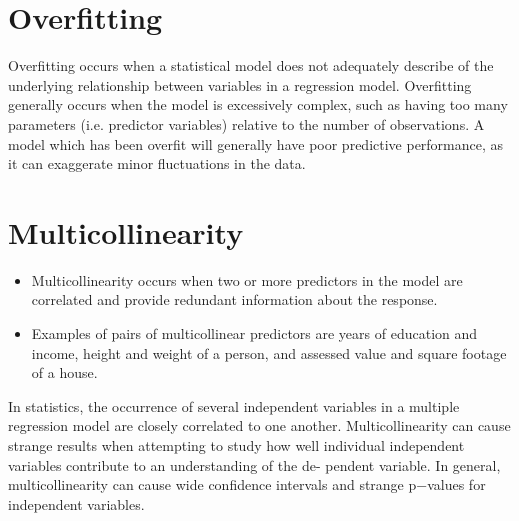 \documentclass[a4paper,12pt]{article}
\begin{document}
\section*{Overfitting}
Overfitting occurs when a statistical model does not adequately describe of the underlying
relationship between variables in a regression model. Overfitting generally occurs when the
model is excessively complex, such as having too many parameters (i.e. predictor variables)
relative to the number of observations. A model which has been overfit will generally have poor
predictive performance, as it can exaggerate minor fluctuations in the data.



\section*{Multicollinearity}
\begin{itemize}

\item Multicollinearity occurs when two or more predictors in the model are correlated
and provide redundant information about the response.
\item  Examples of pairs of multicollinear predictors are years of education and income, height and weight of a
person, and assessed value and square footage of a house.

\end{itemize}


In statistics, the occurrence of several independent variables in a multiple regression model are
closely correlated to one another. Multicollinearity can cause strange results when attempting
to study how well individual independent variables contribute to an understanding of the de-
pendent variable. In general, multicollinearity can cause wide confidence intervals and strange
p−values for independent variables.
\end{document}
